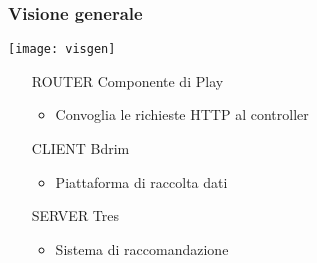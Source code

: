 \begin{frame}
\frametitle{Visione generale}

\begin{minipage}[c]{.60\textwidth}
\centering 
\texttt{[image: visgen]}
\end{minipage}
\begin{minipage}[c]{.38\textwidth}

\begin{itemize}
\item[ROUTER] Componente di Play
\begin{itemize}
\item Convoglia le richieste HTTP al controller
\end{itemize}
\item[CLIENT] Bdrim
\begin{itemize}
\item Piattaforma di raccolta dati
\end{itemize}

\item[SERVER] Tres
\begin{itemize}
\item Sistema di raccomandazione
\end{itemize}
\end{itemize}
\end{minipage}
\end{frame}